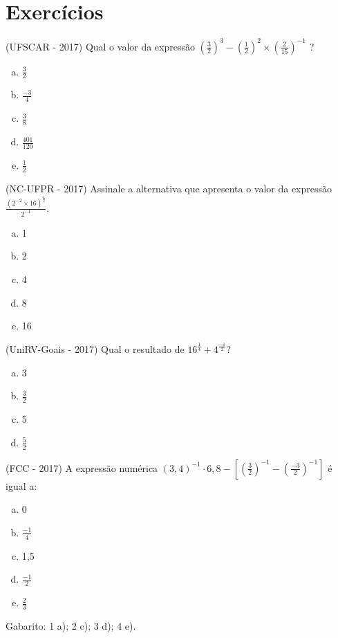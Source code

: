  \section{Exercícios}
 \begin{exer}
(UFSCAR - 2017) Qual o valor da expressão $(\frac{3}{2})^3 - (\frac{1}{2})^2 \times (\frac{2}{15})^{-1}$ ?
  \begin{enumerate}[a)]
  \item $\frac{3}{2}$
  \item $\frac{-3}{4}$
  \item $\frac{3}{8}$
  \item $\frac{401}{120}$
  \item $\frac{1}{2}$
  \end{enumerate}
 \end{exer}

 \begin{exer}
 (NC-UFPR - 2017) Assinale a alternativa que apresenta o valor da expressão $\frac{(2^{-2} \times 16)^{\frac{1}{2}}}{2^{-1}}$.
   \begin{enumerate}[a)]
  \item 1
  \item 2
  \item 4
  \item 8
  \item 16
  \end{enumerate}
 \end{exer}

 \begin{exer}
 (UniRV-Goais - 2017) Qual o resultado de $16^{\frac{1}{4}} + 4^{\frac{-1}{2}}$?
  \begin{enumerate}[a)]
  \item 3
  \item $\frac{3}{2}$
  \item 5
  \item $\frac{5}{2}$
  \end{enumerate}
 \end{exer}

 \begin{exer}
 (FCC - 2017) A expressão numérica $(3,4)^{-1} \cdot 6,8 - \left[ \left(\frac{3}{2} \right)^{-1} - \left(\frac{-3}{2} \right)^{-1} \right]$ é igual a:
  \begin{enumerate}[a)]
  \item 0
  \item $\frac{-1}{4}$
  \item 1,5
  \item $\frac{-1}{2}$
  \item $\frac{2}{3}$
  \end{enumerate}
 \end{exer}

 \begin{exer}
 \end{exer}

 Gabarito: 1 a); 2 c); 3 d); 4 e).

